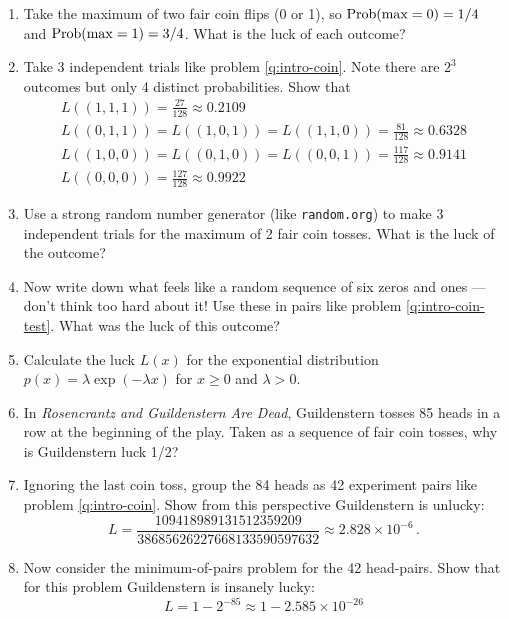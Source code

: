 \begin{enumerate}
\item \label{q:intro-coin} Take the maximum of two fair coin flips (0 or 1), so $\operatorname{Prob}(\max = 0)=1/4$ and $\operatorname{Prob}(\max = 1)=3/4$.  What is the luck of each outcome?
\item \label{q:intro-coins} Take 3 independent trials like problem \ref{q:intro-coin}.  Note there are $2^3$ outcomes but only 4 distinct probabilities.  Show that
  \begin{gather*}
    L((1,1,1))=\frac{27}{128} \approx 0.2109 \\
    L((0,1,1))=L((1,0,1))=L((1,1,0))=\frac{81}{128} \approx 0.6328 \\
    L((1,0,0))=L((0,1,0))=L((0,0,1))=\frac{117}{128} \approx 0.9141 \\
    L((0,0,0))=\frac{127}{128} \approx 0.9922
  \end{gather*}
\item \label{q:intro-coin-test} Use a strong random number generator (like {\tt random.org}) to make 3 independent trials for the maximum of 2 fair coin tosses.  What is the luck of the outcome?
\item \label{q:intro-exp} Now write down what feels like a random sequence of six zeros and ones --- don't think too hard about it!  Use these in pairs like problem \ref{q:intro-coin-test}.  What was the luck of this outcome?
\item Calculate the luck $L(x)$ for the exponential distribution $p(x)=\lambda \exp(-\lambda x)$ for $x\geq 0$ and $\lambda > 0$.

\item In {\em Rosencrantz and Guildenstern Are Dead}, Guildenstern tosses 85 heads in a row at the beginning of the play.  Taken as a sequence of fair coin tosses, why is Guildenstern luck 1/2?

\item Ignoring the last coin toss, group the 84 heads as 42 experiment pairs like problem \ref{q:intro-coin}.  Show from this perspective Guildenstern is unlucky:
  \begin{equation*}
    L=\frac{109418989131512359209}{38685626227668133590597632} \approx 2.828 \times 10^{-6} \,.
  \end{equation*}
\item Now consider the minimum-of-pairs problem for the 42 head-pairs.  Show that for this problem Guildenstern is insanely lucky:
  \begin{equation*}  
  L=1-2^{-85} \approx 1-2.585\times 10^{-26}
  \end{equation*}
\end{enumerate}

